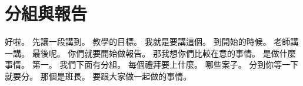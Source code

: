 \section{分組與報告}

\hypertarget{c01:cue:908}{}好啦。
\hypertarget{c01:cue:909}{}先讓一段講到。
\hypertarget{c01:cue:910}{}教學的目標。
\hypertarget{c01:cue:911}{}我就是要講這個。
\hypertarget{c01:cue:912}{}到開始的時候。
\hypertarget{c01:cue:913}{}老師講一講。
\hypertarget{c01:cue:914}{}最後呢。
\hypertarget{c01:cue:915}{}你們就要開始做報告。
\hypertarget{c01:cue:916}{}那我想你們比較在意的事情。
\hypertarget{c01:cue:917}{}是做什麼事情。
\hypertarget{c01:cue:918}{}第一。
\hypertarget{c01:cue:919}{}我們下面有分組。
\hypertarget{c01:cue:920}{}每個禮拜要上什麼。
\hypertarget{c01:cue:921}{}哪些案子。
\hypertarget{c01:cue:922}{}分到你等一下就要分。
\hypertarget{c01:cue:923}{}那個是班長。
\hypertarget{c01:cue:924}{}要跟大家做一起做的事情。

